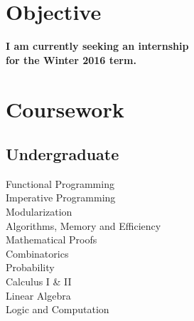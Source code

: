 \documentclass[letterpaper]{deedy-resume}
\begin{document}





\begin{minipage}[t]{0.33\textwidth} 


\section{Objective}
{\bf I am currently seeking an internship\\ for the Winter 2016 term.}\\




\section{Coursework}

\subsection{Undergraduate}

Functional Programming \\
Imperative Programming \\
Modularization \\
Algorithms, Memory and Efficiency \\
Mathematical Proofs \\
Combinatorics \\ 
Probability \\
Calculus I \& II \\
Linear Algebra \\
Logic and Computation \\


\end{minipage}
\end{document}
